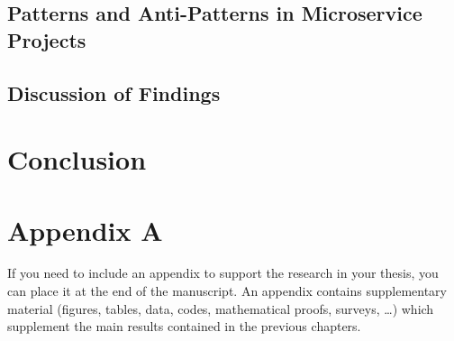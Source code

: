 \documentclass{Configuration_Files/PoliMi3i_thesis}
\begin{document}
\section{Patterns and Anti-Patterns in Microservice Projects}
\label{subsec:pattern_result}

\section{Discussion of Findings}
\label{sec:discussion}


\chapter{Conclusion}
\label{ch:conclusion}%





\cleardoublepage
{} %
\appendix
\chapter{Appendix A}
If you need to include an appendix to support the research in your thesis, you can place it at the end of the manuscript.
An appendix contains supplementary material (figures, tables, data, codes, mathematical proofs, surveys, \dots)
which supplement the main results contained in the previous chapters.

\listoffigures

\listoftables

\end{document}
